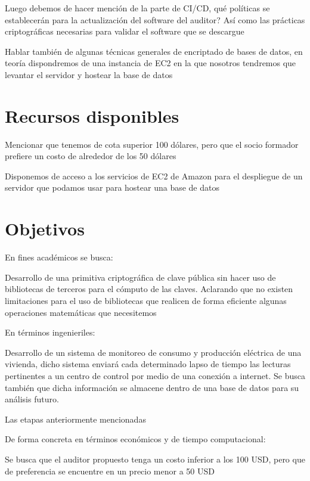 \documentclass{article}
\begin{document}
        Luego debemos de hacer mención de la parte de CI/CD, qué políticas se establecerán para la actualización del software del auditor? Así como las prácticas criptográficas necesarias para validar el software que se descargue

        Hablar también de algunas técnicas generales de encriptado de bases de datos, en teoría dispondremos de una instancia de EC2 en la que nosotros tendremos que levantar el servidor y hostear la base de datos

    \section{Recursos disponibles}

        Mencionar que tenemos de cota superior 100 dólares, pero que el socio formador prefiere un costo de alrededor de los 50 dólares

        Disponemos de acceso a los servicios de EC2 de Amazon para el despliegue de un servidor que podamos usar para hostear una base de datos

    \section{Objetivos}


    En fines académicos se busca:

        Desarrollo de una primitiva criptográfica de clave pública sin hacer uso de bibliotecas de terceros para el cómputo de las claves. Aclarando que no existen limitaciones para el uso de bibliotecas que realicen de forma eficiente algunas operaciones matemáticas que necesitemos

            En términos ingenieriles:

        Desarrollo de un sistema de monitoreo de consumo y producción eléctrica de una vivienda, dicho sistema enviará cada determinado lapso de tiempo las lecturas pertinentes a un centro de control por medio de una conexión a internet. Se busca también que dicha información se almacene dentro de una base de datos para su análisis futuro.

            Las etapas anteriormente mencionadas

        De forma concreta en términos económicos y de tiempo computacional:

        Se busca que el auditor propuesto tenga un costo inferior a los 100 USD, pero que de preferencia se encuentre en un precio menor a 50 USD
\end{document}

